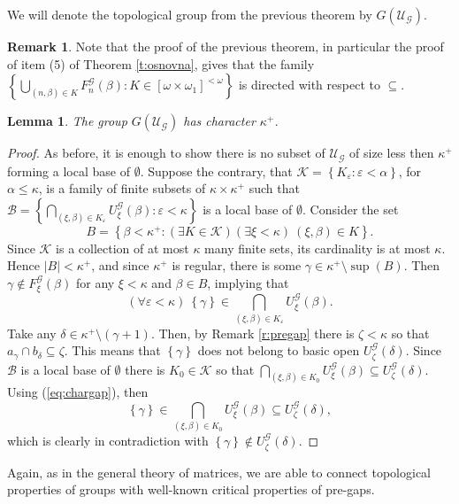 \documentclass{amsart}
\theoremstyle{plain}
\newtheorem{lemma}[theorem]{Lemma}
\theoremstyle{definition}
\newtheorem{remark}[theorem]{Remark}
\numberwithin{equation}{section}
\renewcommand{\a}{\alpha}
\renewcommand{\b}{\beta}
\newcommand{\g}{\gamma}
\renewcommand{\d}{\delta}
\renewcommand{\k}{\kappa}
\renewcommand{\o}{\omega}
\newcommand{\ps}{\emptyset}
\newcommand{\sst}{\subseteq}
\newcommand{\cu}{\mathcal U}
\newcommand{\set}[1]{\left\{#1\right\}}
\newcommand{\abs}[1]{\left\vert#1\right\vert}
\begin{document}
We will denote the topological group from the previous theorem by $G(\cu_{\mathcal G})$.

\begin{remark}\label{r:directedgap}
	Note that the proof of the previous theorem, in particular the proof of item (5) of Theorem \ref{t:osnovna}, gives that the family $\set{\bigcup_{(n,\b)\in K}F^{\mathcal G}_n(\b): K\in \left[\o\times\o_1\right]^{<\o}}$ is directed with respect to $\sst$.
\end{remark}

\begin{lemma}\label{l:gap-character}
	The group $G(\cu_\mathcal{G})$ has character $\k^+$.
\end{lemma}

\begin{proof}
	As before, it is enough to show there is no subset of $\cu_{\mathcal G}$ of size less then $\k^+$ forming a local base of $\ps$.
	Suppose the contrary, that $\mathcal K=\set{K_{\varepsilon}:\varepsilon<\a}$, for $\a\le\k$, is a family of finite subsets of $\k\times\k^+$ such that $\mathcal B=\set{\bigcap_{(\xi,\b)\in K_{\varepsilon}}U^{\mathcal G}_{\xi}(\b):\varepsilon<\k}$ is a local base of $\ps$.
	Consider the set $$B=\set{\b<\k^+:(\exists K\in\mathcal K)(\exists \xi<\k)\ (\xi,\b)\in K}.$$
	Since $\mathcal K$ is a collection of at most $\k$ many finite sets, its cardinality is at most $\k$.
	Hence $\abs{B}<\k^+$, and since $\k^+$ is regular, there is some $\g\in \k^+\setminus \sup(B)$.
	Then $\g\notin F^{\mathcal G}_{\xi}(\b)$ for any $\xi<\k$ and $\b\in B$, implying that \begin{equation}\label{eq:chargap}\textstyle(\forall\varepsilon<\k)\ \set{\g}\in \bigcap_{(\xi,\b)\in K_{\varepsilon}}U^{\mathcal G}_{\xi}(\b).\end{equation}
	Take any $\d\in \k^+\setminus (\g+1)$.
	Then, by Remark \ref{r:pregap} there is $\zeta<\k$ so that $a_{\g}\cap b_{\d}\sst \zeta$.
	This means that $\set{\g}$ does not belong to basic open $U^{\mathcal G}_{\zeta}(\d)$.
	Since $\mathcal B$ is a local base of $\ps$ there is $K_0\in\mathcal K$ so that $\bigcap_{(\xi,\b)\in K_0}U^{\mathcal G}_{\xi}(\b)\sst U^{\mathcal G}_{\zeta}(\d)$.
	Using (\ref{eq:chargap}), then $$\textstyle\set{\g}\in \bigcap_{(\xi,\b)\in K_0}U^{\mathcal G}_{\xi}(\b)\sst U^{\mathcal G}_{\zeta}(\d),$$ which is clearly in contradiction with $\set{\g}\notin U^{\mathcal G}_{\zeta}(\d)$.
\end{proof}

Again, as in the general theory of matrices, we are able to connect topological properties of groups with well-known critical properties of pre-gaps.
\end{document}

